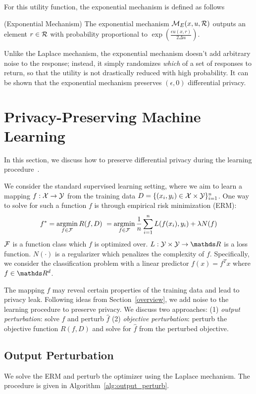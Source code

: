 \documentclass{article} %
\begin{document}
For this utility function, the exponential mechanism is defined as follows
\begin{definition}{(Exponential Mechanism)}
The exponential mechanism $\mathcal{M}_E(x, u, \mathcal{R})$ outputs an element $r \in \mathcal{R}$ with
probability proportional to $\exp{(\frac{\epsilon u(x, r)}{2 \Delta u})}$.
\label{def:exponential_mechanism}
\end{definition}

Unlike the Laplace mechanism, the exponential mechanism doesn't add arbitrary
noise to the response; instead, it simply randomizes \textit{which} of a set of
responses to return, so that the utility is not drastically reduced with high
probability. It can be shown that the exponential mechanism preserves
$(\epsilon, 0)$ differential privacy.

\section{Privacy-Preserving Machine Learning}
In this section, we discuss how to preserve differential privacy during the learning procedure~\cite{chaudhuri2011erm}.

We consider the standard supervised learning setting, where we aim to learn a mapping $f: \mathcal{X} \rightarrow \mathcal{Y}$ from the training data $D = \{(x_i, y_i) \in \mathcal{X} \times \mathcal{Y}\}_{i=1}^n$. One way to solve for such a function $f$ is through empirical risk minimization (ERM):
$$f^* = \operatorname*{argmin}_{f\in \mathcal{F}} R(f, D) \ =\operatorname*{argmin}_{f\in \mathcal{F}} \frac{1}{n}\sum_{i=1}^n L(f(x_i), y_i) + \lambda N(f)$$
$\mathcal{F}$ is a function class which $f$ is optimized over. $L:\Y \times \Y \rightarrow \R$ is a loss function. $N(\cdot)$ is a regularizer which penalizes the complexity of $f$. Specifically, we consider the classification problem with a linear predictor $f(x) = f^T x$ where $f\in \R^d$.

The mapping $f$ may reveal certain properties of the training data and lead to privacy leak. Following ideas from Section~\ref{overview}, we add noise to the learning procedure to preserve privacy. We discuss two approaches: (1) \emph{output perturbation}: solve $\hat{f}$ and perturb $\hat{f}$ (2) \emph{objective perturbation}: perturb the objective function $R(f, D)$ and solve for $\hat{f}$ from the perturbed objective.

\subsection{Output Perturbation}
We solve the ERM and perturb the optimizer using the Laplace mechanism. The procedure is given in Algorithm~\ref{alg:output_perturb}.
\end{document}
